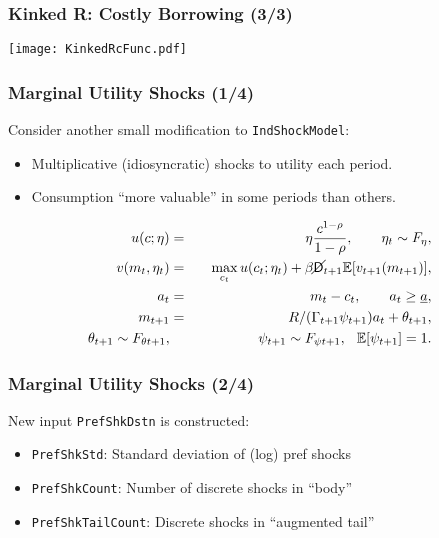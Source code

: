 \documentclass[11ptt]{beamer}
\newcommand{\E}{\mathbb{E}}
\newcommand{\bi}{\begin{itemize}}
\newcommand{\ei}{\end{itemize}}
\newcommand{\Die}{\mathsf{D}}
\newcommand{\Live}{\cancel{\Die}}
\begin{document}
\begin{frame}
\frametitle{Kinked R: Costly Borrowing (3/3)}
\begin{center}
\texttt{[image: KinkedRcFunc.pdf]}
\end{center}
\end{frame}


\begin{frame}
\frametitle{Marginal Utility Shocks (1/4)}
Consider another small modification to \texttt{IndShockModel}:
\bi
\item Multiplicative (idiosyncratic) shocks to utility each period.

\item Consumption ``more valuable'' in some periods than others.
\ei
\begin{eqnarray*}
u(c;\eta) &=& \eta \frac{c^{1-\rho}}{1-\rho}, \qquad \eta_t \sim F_{\eta}, \\
v(m_t,\eta_t) &=& \max_{c_t} u(c_t;\eta_t) + \beta \Live_{t+1} \E [v_{t+1}(m_{t+1}) ], \\
a_t &=& m_t - c_t, \qquad a_t \geq \underline{a}, \\
m_{t+1} &=& R/(\Gamma_{t+1} \psi_{t+1}) a_t + \theta_{t+1}, \\
\theta_{t+1} \sim F_{\theta t+1}, &\qquad& \psi_{t+1} \sim F_{\psi t+1}, \hspace{0.25cm} \E[\psi_{t+1}] = 1.
\end{eqnarray*}
\end{frame}

\begin{frame}
\frametitle{Marginal Utility Shocks (2/4)}
New input \texttt{PrefShkDstn} is constructed:
\begin{itemize}
\item \texttt{PrefShkStd}: Standard deviation of (log) pref shocks

\item \texttt{PrefShkCount}: Number of discrete shocks in ``body''

\item \texttt{PrefShkTailCount}: Discrete shocks in ``augmented tail''
\end{itemize}
\end{frame}
\end{document}
